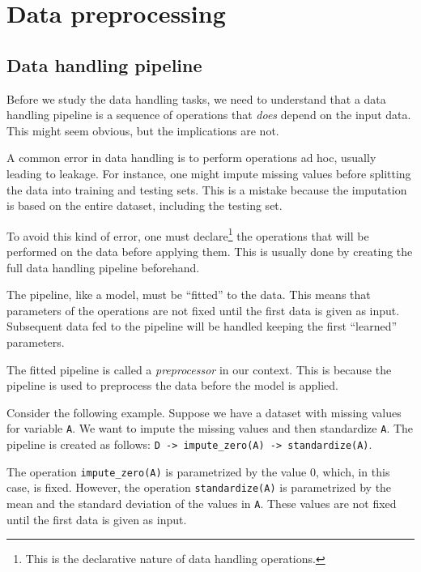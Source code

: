 \chapter{Data preprocessing}


\section{Data handling pipeline}

Before we study the data handling tasks, we need to understand that a data handling
pipeline is a sequence of operations that \emph{does} depend on the input data.
This might seem obvious, but the implications are not.

A common error in data handling is to perform operations ad hoc, usually leading to
\gls{leakage}.  For instance, one might impute missing values before splitting the data into
training and testing sets.  This is a mistake because the imputation is based on the
entire dataset, including the testing set.

To avoid this kind of error, one must declare\footnote{This is the declarative nature of
data handling operations.} the operations that will be performed on the data before
applying them.  This is usually done by creating the full data handling pipeline
beforehand.

The pipeline, like a model, must be ``fitted'' to the data.  This means that parameters of
the operations are not fixed until the first data is given as input.  Subsequent data fed
to the pipeline will be handled keeping the first ``learned'' parameters.

The fitted pipeline is called a \emph{preprocessor} in our context.  This is because the
pipeline is used to preprocess the data before the model is applied.

Consider the following example.  Suppose we have a dataset with missing values for
variable \texttt{A}.  We want to impute the missing values and then standardize
\texttt{A}.  The pipeline is created as follows:  \texttt{D -> impute\_zero(A) ->
standardize(A)}.

The operation \texttt{impute\_zero(A)} is parametrized by the value 0, which, in this case,
is fixed.  However, the operation \texttt{standardize(A)} is parametrized by the mean and
the standard deviation of the values in \texttt{A}.  These values are not fixed until the
first data is given as input.


